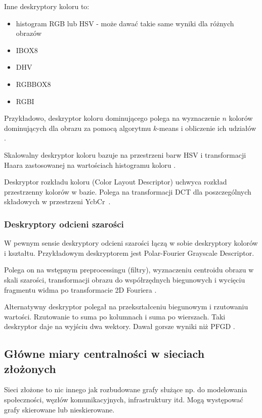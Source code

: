 \documentclass[wi]{zut}
\begin{document}
Inne deskryptory koloru to:

\begin{itemize}
\item histogram RGB lub HSV - może dawać takie same wyniki dla różnych obrazów
\item IBOX8
\item DHV
\item RGBBOX8
\item RGBI \cite{Frejlichowski2020_6}
\end{itemize}

Przykładowo, deskryptor koloru dominującego polega na wyznaczenie $n$ kolorów dominujących dla obrazu za pomocą algorytmu $k$-means i obliczenie ich udziałów \cite{Frejlichowski2020_6}.

Skalowalny deskryptor koloru bazuje na przestrzeni barw HSV i transformacji Haara zastosowanej na wartościach histogramu koloru \cite{Frejlichowski2020_6}.

Deskryptor rozkładu koloru (Color Layout Descriptor) uchwyca rozkład przestrzenny kolorów w bazie. Polega na transformacji DCT dla poszczególnych składowych w przestrzeni YcbCr~\cite{Frejlichowski2020_6}.

\subsubsection{Deskryptory odcieni szarości}

W pewnym sensie deskryptory odcieni szarości łączą w sobie deskryptory kolorów i kształtu. Przykładowym deskryptorem jest Polar-Fourier Grayscale Descriptor.

Polega on na wstępnym preprocessingu (filtry), wyznaczeniu centroidu obrazu w skali szarości, transformacji obrazu do współrzędnych biegunowych i wycięciu fragmentu widma po transformacie 2D Fouriera \cite{frejlichowski2015application}.

Alternatywny deskryptor polegał na przekształceniu biegunowym i rzutowaniu wartości. Rzutowanie to suma po kolumnach i suma po wierszach. Taki deskryptor daje na wyjściu dwa wektory. Dawał gorsze wyniki niż PFGD \cite{Frejlichowski2020_5}.


\subsection{Główne miary centralności w sieciach złożonych}

Sieci złożone to nic innego jak rozbudowane grafy służące np. do modelowania społeczności, węzłów komunikacyjnych, infrastruktury itd. Mogą występować grafy skierowane lub nieskierowane.
\end{document}
